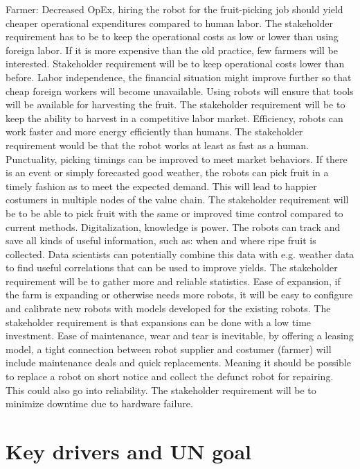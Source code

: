 \documentclass[%
oneside,    %
project,    %
nosummary   %
]{USN-MSc}
\begin{document}
Farmer:
Decreased OpEx, hiring the robot for the fruit-picking job should yield cheaper operational expenditures compared to human labor. The stakeholder requirement has to be to keep the operational costs as low or lower than using foreign labor. If it is more expensive than the old practice, few farmers will be interested. Stakeholder requirement will be to keep operational costs lower than before.
Labor independence, the financial situation might improve further so that cheap foreign workers will become unavailable. Using robots will ensure that tools will be available for harvesting the fruit. The stakeholder requirement will be to keep the ability to harvest in a competitive labor market.
Efficiency, robots can work faster and more energy efficiently than humans. The stakeholder requirement would be that the robot works at least as fast as a human.
Punctuality, picking timings can be improved to meet market behaviors. If there is an event or simply forecasted good weather, the robots can pick fruit in a timely fashion as to meet the expected demand. This will lead to happier costumers in multiple nodes of the value chain. The stakeholder requirement will be to be able to pick fruit with the same or improved time control compared to current methods.
Digitalization, knowledge is power. The robots can track and save all kinds of useful information, such as: when and where ripe fruit is collected. Data scientists can potentially combine this data with e.g. weather data to find useful correlations that can be used to improve yields. The stakeholder requirement will be to gather more and reliable statistics.
Ease of expansion, if the farm is expanding or otherwise needs more robots, it will be easy to configure and calibrate new robots with models developed for the existing robots. The stakeholder requirement is that expansions can be done with a low time investment.
Ease of maintenance, wear and tear is inevitable, by offering a leasing model, a tight connection between robot supplier and costumer (farmer) will include maintenance deals and quick replacements. Meaning it should be possible to replace a robot on short notice and collect the defunct robot for repairing. This could also go into reliability. The stakeholder requirement will be to minimize downtime due to hardware failure.

\chapter{Key drivers and UN goal}
\label{ch:keyDriversUn}
\end{document}

